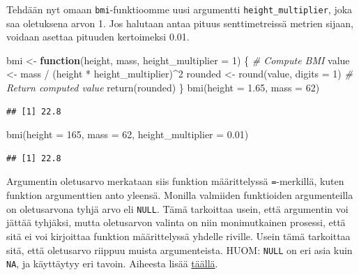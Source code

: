 \documentclass[
]{book}
\newenvironment{Shaded}{\begin{snugshade}}{\end{snugshade}}
\newcommand{\AttributeTok}[1]{\textcolor[rgb]{0.77,0.63,0.00}{#1}}
\newcommand{\CommentTok}[1]{\textcolor[rgb]{0.56,0.35,0.01}{\textit{#1}}}
\newcommand{\ControlFlowTok}[1]{\textcolor[rgb]{0.13,0.29,0.53}{\textbf{#1}}}
\newcommand{\DecValTok}[1]{\textcolor[rgb]{0.00,0.00,0.81}{#1}}
\newcommand{\FloatTok}[1]{\textcolor[rgb]{0.00,0.00,0.81}{#1}}
\newcommand{\FunctionTok}[1]{\textcolor[rgb]{0.00,0.00,0.00}{#1}}
\newcommand{\NormalTok}[1]{#1}
\newcommand{\OtherTok}[1]{\textcolor[rgb]{0.56,0.35,0.01}{#1}}
\newcommand{\SpecialCharTok}[1]{\textcolor[rgb]{0.00,0.00,0.00}{#1}}
\begin{document}
Tehdään nyt omaan \texttt{bmi}-funktioomme uusi argumentti \texttt{height\_multiplier}, joka saa oletuksena arvon 1. Jos halutaan antaa pituus senttimetreissä metrien sijaan, voidaan asettaa pituuden kertoimeksi 0.01.

\begin{Shaded}
\begin{Highlighting}[]
\NormalTok{bmi }\OtherTok{\textless{}{-}} \ControlFlowTok{function}\NormalTok{(height, mass, }\AttributeTok{height\_multiplier =} \DecValTok{1}\NormalTok{) \{}
  \CommentTok{\# Compute BMI}
\NormalTok{  value }\OtherTok{\textless{}{-}}\NormalTok{ mass }\SpecialCharTok{/}\NormalTok{ (height }\SpecialCharTok{*}\NormalTok{ height\_multiplier)}\SpecialCharTok{\^{}}\DecValTok{2}
\NormalTok{  rounded }\OtherTok{\textless{}{-}} \FunctionTok{round}\NormalTok{(value, }\AttributeTok{digits =} \DecValTok{1}\NormalTok{)}
  \CommentTok{\# Return computed value}
  \FunctionTok{return}\NormalTok{(rounded)}
\NormalTok{\}}
\FunctionTok{bmi}\NormalTok{(}\AttributeTok{height =} \FloatTok{1.65}\NormalTok{, }\AttributeTok{mass =} \DecValTok{62}\NormalTok{)}
\end{Highlighting}
\end{Shaded}

\begin{verbatim}
## [1] 22.8
\end{verbatim}

\begin{Shaded}
\begin{Highlighting}[]
\FunctionTok{bmi}\NormalTok{(}\AttributeTok{height =} \DecValTok{165}\NormalTok{, }\AttributeTok{mass =} \DecValTok{62}\NormalTok{, }\AttributeTok{height\_multiplier =} \FloatTok{0.01}\NormalTok{)}
\end{Highlighting}
\end{Shaded}

\begin{verbatim}
## [1] 22.8
\end{verbatim}

Argumentin oletusarvo merkataan siis funktion määrittelyssä \texttt{=}-merkillä, kuten funktion argumenttien anto yleensä. Monilla valmiiden funktioiden argumenteilla on oletusarvona tyhjä arvo eli \texttt{NULL}. Tämä tarkoittaa usein, että argumentin voi jättää tyhjäksi, mutta oletusarvon valinta on niin monimutkainen prosessi, että sitä ei voi kirjoittaa funktion määrittelyssä yhdelle riville. Usein tämä tarkoittaa sitä, että oletusarvo riippuu muista argumenteista. HUOM: \texttt{NULL} on eri asia kuin \texttt{NA}, ja käyttäytyy eri tavoin. Aiheesta lisää \href{https://www.r-bloggers.com/r-na-vs-null/}{täällä}.
\end{document}
